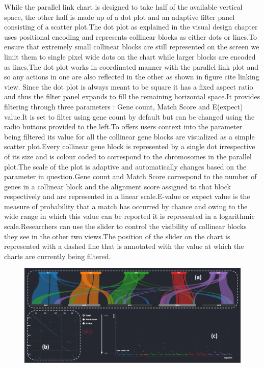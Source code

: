 While the parallel link chart is designed to take half of the available vertical space, the other half is made up of a dot plot and an adaptive filter panel consisting of a scatter plot.The dot plot as explained in the visual design chapter uses positional encoding and represents collinear blocks as either dots or lines.To ensure that extremely small collinear blocks are still represented on the screen we limit them to single pixel wide dots on the chart while larger blocks are encoded as lines.The dot plot works in coordinated manner with the parallel link plot and so any actions in one are also reflected in the other as shown in figure {cite linking view}. Since the dot plot is always meant to be square it has a fixed aspect ratio and thus the filter panel expands to fill the remaining horizontal space.It provides filtering through three parameters : Gene count, Match Score and E(expect) value.It is set to filter using gene count by default but can be changed using the radio buttons provided to the left.To offers users context into the parameter being filtered its value for all the collinear gene blocks are visualized as a simple scatter plot.Every collinear gene block is represented by a single dot irrespective of its size  and is colour coded to correspond to the chromosomes in the parallel plot.The scale of the plot is adaptive and automatically changes based on the parameter in question.Gene count and Match Score correspond to the number of genes in a collinear block and the alignment score assigned to that block respectively and are represented in a linear scale.E-value or expect value is the measure of probability that a match has occurred by chance and owing to the wide range in which this value can be reported it is represented in a logarithmic scale.Researchers can use the slider to control the visibility of collinear blocks they see in the other two views.The position of the slider on the chart is represented with a dashed line that is annotated with the value at which the charts are currently being filtered.

\begin{figure}
  \centering
  \includegraphics[width=.75\linewidth]{images/ch_1_dashboard.PNG}
  \label{fig:ch_4_dashboard}
\end{figure}


